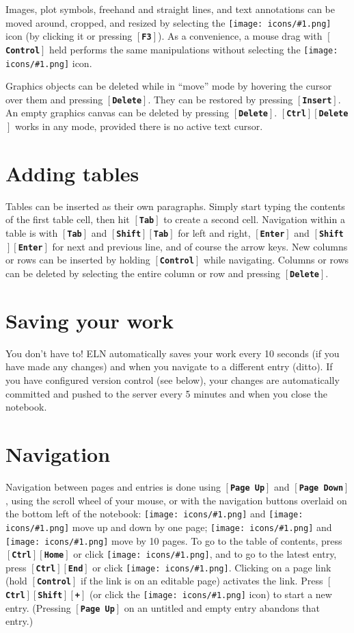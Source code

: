 \documentclass[11pt]{report}
\def\keystroke#1{$\left[\right.\!${\tt\bfseries #1}$\!\left.\right]$}
\def\key#1{\keystroke{#1}}
\def\keycombo#1#2{\keystroke{#1}\keystroke{#2}}
\def\keycontrol#1{\keycombo{Ctrl}{#1}}
\def\keyshift#1{\keycombo{Shift}{#1}}
\def\controlshift#1{\keystroke{Ctrl}\keystroke{Shift}\keystroke{#1}}
\def\icon#1{\raise-2pt\hbox{\texttt{[image: icons/\#1.png]}}}
\begin{document}
Images, plot symbols, freehand and straight lines, and text
annotations can be moved around, cropped, and resized by selecting the
\icon{move} icon (by clicking it or pressing \key{F3}). As a
convenience, a mouse drag with \key{Control} held performs the same
manipulations without selecting the \icon{move} icon.

Graphics objects can be deleted while in ``move'' mode by hovering the
cursor over them and pressing \key{Delete}. They can be restored by
pressing \key{Insert}. An empty graphics canvas can be deleted by
pressing \key{Delete}. \keycontrol{Delete} works in any mode, provided
there is no active text cursor.

\section{Adding tables}

Tables can be inserted as their own paragraphs. Simply start typing
the contents of the first table cell, then hit \key{Tab} to create a
second cell. Navigation within a table is with \key{Tab} and
\keyshift{Tab} for left and right, \key{Enter} and \keyshift{Enter}
for next and previous line, and of course the arrow keys. New columns
or rows can be inserted by holding \key{Control} while
navigating. Columns or rows can be deleted by selecting the entire
column or row and pressing \key{Delete}.

\section{Saving your work}

You don't have to! ELN automatically saves your work every 10 seconds
(if you have made any changes) and when you navigate to a different
entry (ditto). If you have configured version control (see below),
your changes are automatically committed and pushed to the server
every 5 minutes and when you close the notebook.

\section{Navigation}

Navigation between pages and entries is done using \key{Page Up} and
\key{Page Down}, using the scroll wheel of your mouse, or with the
navigation buttons overlaid on the bottom left of the notebook:
\icon{nav-prev} and \icon{nav-next} move up and down by one page;
\icon{nav-p10} and \icon{nav-n10} move by 10 pages. To go
to the table of contents, press \keycontrol{Home} or click
\icon{nav-toc}, and to go to the latest entry, press \keycontrol{End}
or click \icon{nav-end}. Clicking on a page link (hold \key{Control}
if the link is on an editable page) activates the link. Press
\controlshift{+} (or click the \icon{nav-plus} icon) to start a new
entry. (Pressing
\key{Page Up} on an untitled and empty  entry  abandons that 
entry.)
\end{document}
